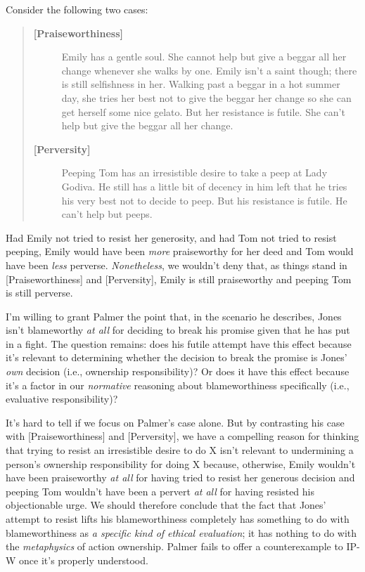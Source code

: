 \documentclass[a4paper,12pt]{article}
\begin{document}
Consider the following two cases:

\begin{quote}
\begin{description}
\item[\textbf{[Praiseworthiness]}] Emily has a gentle soul. She cannot help but give a beggar all her change whenever she walks by one. Emily isn't a saint though; there is still selfishness in her. Walking past a beggar in a hot summer day, she tries her best not to give the beggar her change so she can get herself some nice gelato. But her resistance is futile. She can't help but give the beggar all her change.
\item[\textbf{[Perversity]}] Peeping Tom has an irresistible desire to take a peep at Lady Godiva. He still has a little bit of decency in him left that he tries his very best not to decide to peep. But his resistance is futile. He can't help but peeps.
\end{description}
\end{quote}

Had Emily not tried to resist her generosity, and had Tom not tried to resist peeping, Emily would have been \emph{more} praiseworthy for her deed and Tom would have been \emph{less} perverse. \emph{Nonetheless}, we wouldn't deny that, as things stand in [Praiseworthiness] and [Perversity], Emily is still praiseworthy and peeping Tom is still perverse.\footnotemark


I'm willing to grant Palmer the point that, in the scenario he describes, Jones isn't blameworthy \emph{at all} for deciding to break his promise given that he has put in a fight. The question remains: does his futile attempt have this effect because it's relevant to determining whether the decision to break the promise is Jones' \emph{own} decision (i.e., ownership responsibility)? Or does it have this effect because it's a factor in our \emph{normative} reasoning about blameworthiness  specifically (i.e., evaluative responsibility)?

It's hard to tell if we focus on Palmer's case alone. But by contrasting his case with [Praiseworthiness] and [Perversity], we have a compelling reason for thinking that trying to resist an irresistible desire to do X isn't relevant to undermining a person's ownership responsibility for doing X because, otherwise, Emily wouldn't have been praiseworthy \emph{at all} for having tried to resist her generous decision and peeping Tom wouldn't have been a pervert \emph{at all} for having resisted his objectionable urge. We should therefore conclude that the fact that Jones' attempt to resist lifts his blameworthiness completely has something to do with blameworthiness as \emph{a specific kind of ethical evaluation}; it has nothing to do with the \emph{metaphysics} of action ownership. Palmer fails to offer a counterexample to IP-W once it's properly understood.
\end{document}
